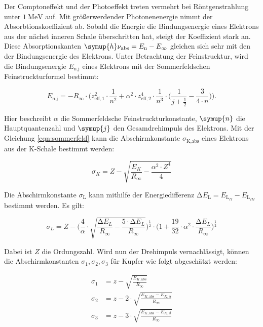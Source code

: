 Der Comptoneffekt und der Photoeffekt treten vermehrt bei Röntgenstrahlung unter $\SI{1}{\mega\electronvolt}$ auf.
Mit größerwerdender Photonenenergie nimmt der Absorbtionskoeffizient ab.
Sobald die Energie die Bindungsenergie eines Elektrons aus der nächst inneren Schale überschritten hat, steigt der Koeffizient stark an.
Diese Absorptionskanten $\symup{h} \nu_\text{abs} = E_\text{n} - E_\infty$ gleichen sich sehr mit den der Bindungsenergie des Elektrons.
Unter Betrachtung der Feinstrucktur, wird die Bindungsenergie $E_\text{n,j}$ eines Elektrons mit der Sommerfeldschen Feinstruckturformel bestimmt:

\begin{equation}
    \label{eqn:sommerfeld}
    E_\text{n,j} = -R_\infty \cdot \Biggl( z^2_{\text{eff},1} \cdot \frac{1}{n^2} + \alpha^2 \cdot z^4_{\text{eff},2} \cdot \frac{1}{n^3} \cdot \Biggl(\frac{1}{j + \frac{1}{2}} - \frac{3}{4 \cdot n} \Biggr)\Biggr).
\end{equation}

Hier beschreibt $\alpha$ die Sommerfeldsche Feinstruckturkonstante, $\symup{n}$ die Hauptquantenzahl und $\symup{j}$ den Gesamdrehimpuls des Elektrons.
Mit der Gleichung \eqref{eqn:sommerfeld} kann die Abschirmkonstante $\sigma_\text{K,abs}$ eines Elektrons aus der K-Schale bestimmt werden:

\begin{equation}
    \sigma_K = Z - \sqrt{\frac{E_K}{R_\infty} - \frac{\alpha^2 \cdot Z^4}{4}}
\end{equation}

Die Abschirmkonstante $\sigma_\text{L}$ kann mithilfe der Energiedifferenz $\increment E_\text{L} = E_\text{L}_{II} -E_\text{L}_{III}$ bestimmt werden.
Es gilt:

\begin{equation}
    \sigma_L = Z -\Biggl( \frac{4}{\alpha} \cdot \sqrt{\frac{\increment E_L}{R_\infty} - \frac{5 \cdot \increment E_L}{R_\infty}} \Biggr)^{\frac{1}{2}}
                \cdot \Biggl(1 + \frac{19}{32} \cdot \alpha^2 \cdot \frac{\increment E_L}{R_\infty} \Biggr)^{\frac{1}{2}}
\end{equation}

Dabei ist $Z$ die Ordungszahl.
Wird nun der Drehimpuls vernachlässigt, können die Abschirmkonstanten $\sigma_1, \sigma_2, \sigma_3$ für Kupfer wie folgt abgeschätzt werden:

\begin{align}
    \sigma_1 &= z - \sqrt{\frac{E_{K,\text{abs}}}{R_\infty}} \label{eq:sigma1} \\
    \sigma_2 &= z - 2 \cdot \sqrt{\frac{E_{K,\text{abs}} - E_{K, \alpha}}{R_\infty}} \label{eq:sigma2} \\
    \sigma_3 &= z - 3 \cdot \sqrt{\frac{E_{K,\text{abs}} - E_{K, \beta}}{R_\infty}} \label{eq:sigma3} \\
\end{align}

